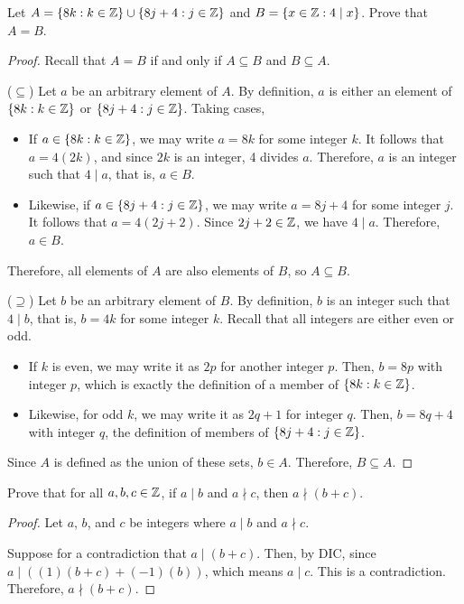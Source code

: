 \documentclass{agony}
\begin{document}
\question Let $A=\{8k : k\in\mathbb{Z}\}\cup\{8j+4 : j\in\mathbb{Z}\}$ and $B=\{x\in\mathbb{Z} : 4 \mid x\}$.
Prove that $A=B$.
\begin{proof}
  Recall that $A=B$ if and only if $A\subseteq B$ and $B \subseteq A$.

  ($\subseteq$) Let $a$ be an arbitrary element of $A$.
  By definition, $a$ is either an element of $\{8k : k\in\mathbb{Z}\}$ or $\{8j+4 : j\in\mathbb{Z}\}$.
  Taking cases,
  \begin{itemize}
    \item If $a\in\{8k : k\in\mathbb{Z}\}$, we may write $a=8k$ for some integer $k$.
          It follows that $a=4(2k)$, and since $2k$ is an integer, 4 divides $a$.
          Therefore, $a$ is an integer such that $4 \mid a$, that is, $a \in B$.
    \item Likewise, if $a\in\{8j+4 : j\in\mathbb{Z}\}$, we may write $a=8j+4$ for some integer $j$.
          It follows that $a=4(2j+2)$. Since $2j+2\in\mathbb{Z}$, we have $4 \mid a$.
          Therefore, $a\in B$.
  \end{itemize}
  Therefore, all elements of $A$ are also elements of $B$, so $A \subseteq B$.

  ($\supseteq$) Let $b$ be an arbitrary element of $B$.
  By definition, $b$ is an integer such that $4 \mid b$, that is, $b = 4k$ for some integer $k$.
  Recall that all integers are either even or odd.
  \begin{itemize}
    \item If $k$ is even, we may write it as $2p$ for another integer $p$.
          Then, $b = 8p$ with integer $p$, which is exactly the definition of a member of $\{8k : k\in\mathbb{Z}\}$.
    \item Likewise, for odd $k$, we may write it as $2q+1$ for integer $q$.
          Then, $b = 8q+4$ with integer $q$, the definition of members of $\{8j+4 : j\in\mathbb{Z}\}$.
  \end{itemize}
  Since $A$ is defined as the union of these sets, $b\in A$.
  Therefore, $B \subseteq A$.
\end{proof}


\question Prove that for all $a,b,c\in\mathbb{Z}$, if $a \mid b$ and $a \nmid c$, then $a \nmid (b+c)$.
\begin{proof}
  Let $a$, $b$, and $c$ be integers where $a \mid b$ and $a \nmid c$.

  Suppose for a contradiction that $a \mid (b+c)$.
  Then, by DIC, since $a \mid ((1)(b+c) + (-1)(b))$, which means $a \mid c$.
  This is a contradiction.
  Therefore, $a \nmid (b+c)$.
\end{proof}
\end{document}
